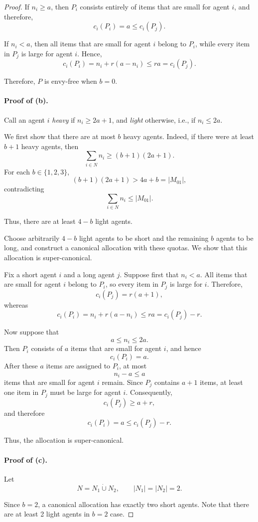 \documentclass{article}
\theoremstyle{definition}
\begin{document}
\begin{proof}
If $n_i\ge a$, then $P_i$ consists entirely of items that are small
for agent $i$, and therefore,
\[
    c_i(P_i)=a\le c_i(P_j).
\]

If $n_i<a$, then all items that are small for agent $i$ belong to
$P_i$, while every item in $P_j$ is large for agent $i$.  Hence,
\[
    c_i(P_i)=n_i+r(a-n_i)\le ra=c_i(P_j).
\]

Therefore, $P$ is envy-free when $b=0$.

\paragraph{Proof of (b).}
Call an agent $i$ \emph{heavy} if $n_i\ge 2a+1$, and \emph{light} otherwise, i.e., if $n_i\le 2a$.

We first show that there are at most $b$ heavy agents.  Indeed, if
there were at least $b+1$ heavy agents, then
\[
    \sum_{i\in N} n_i\ge (b+1)(2a+1).
\]
For each $b\in\{1,2,3\}$,
\[
    (b+1)(2a+1)>4a+b=|M_{01}|,
\]
contradicting
\[
    \sum_{i\in N}n_i\le |M_{01}|.
\]

Thus, there are at least $4-b$ light agents.

Choose arbitrarily $4-b$ light agents to be short and the remaining $b$ agents
to be long, and construct a canonical allocation with these quotas.
We show that this allocation is super-canonical.

Fix a short agent $i$ and a long agent $j$.  Suppose first that $n_i<a$.  All items that are small for agent $i$
belong to $P_i$, so every item in $P_j$ is large for $i$.  Therefore,
\[
    c_i(P_j)=r(a+1),
\]
whereas
\[
    c_i(P_i)=n_i+r(a-n_i)\le ra=c_i(P_j)-r.
\]

Now suppose that
\[
    a\le n_i\le 2a.
\]
Then $P_i$ consists of $a$ items that are small for agent $i$, and
hence
\[
    c_i(P_i)=a.
\]
After these $a$ items are assigned to $P_i$, at most $$n_i-a\le a$$ items that are small for agent $i$ remain.  Since $P_j$ contains
$a+1$ items, at least one item in $P_j$ must be large for agent $i$.
Consequently,
\[
    c_i(P_j)\ge a+r,
\]
and therefore
\[
    c_i(P_i)=a\le c_i(P_j)-r.
\]

Thus, the allocation is super-canonical.

\paragraph{Proof of (c).}
Let
\[
    N=N_1\mathbin{\dot\cup}N_2,
    \qquad
    |N_1|=|N_2|=2.
\]

Since $b=2$, a canonical allocation has exactly two short agents. Note that there are at least 2 light agents in $b=2$
 case.
 

\end{proof}
\end{document}
